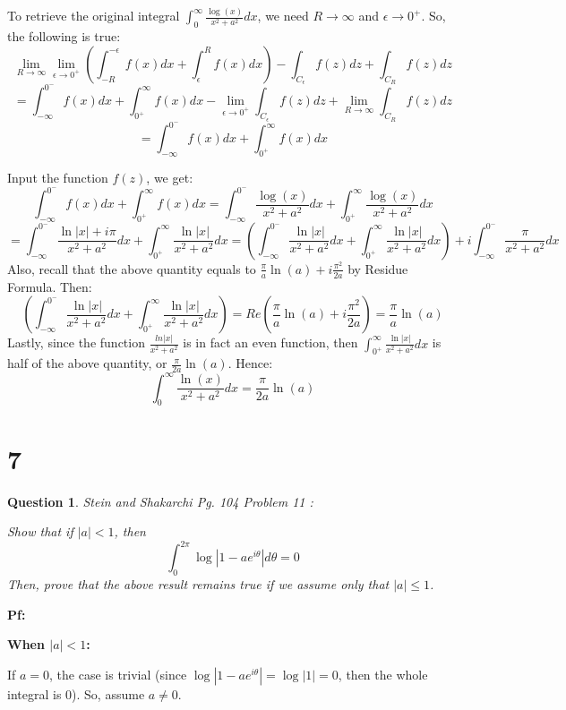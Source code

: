 \documentclass{article}
\newtheorem{question}{Question}
\begin{document}
To retrieve the original integral $\int_{0}^{\infty}\frac{\log(x)}{x^2+a^2}dx$, we need $R\rightarrow\infty$ and $\epsilon\rightarrow 0^+$. So, the following is true:
$$\lim_{R\rightarrow\infty}\lim_{\epsilon\rightarrow 0^+}\left(\int_{-R}^{-\epsilon}f(x)dx+\int_{\epsilon}^{R}f(x)dx\right) - \int_{C_\epsilon}f(z)dz + \int_{C_R}f(z)dz$$
$$ = \int_{-\infty}^{0^-}f(x)dx + \int_{0^+}^{\infty}f(x)dx - \lim_{\epsilon\rightarrow 0^+}\int_{C_\epsilon}f(z)dz + \lim_{R\rightarrow\infty}\int_{C_R}f(z)dz$$
$$ = \int_{-\infty}^{0^-}f(x)dx + \int_{0^+}^{\infty}f(x)dx$$

Input the function $f(z)$, we get:
$$\int_{-\infty}^{0^-}f(x)dx + \int_{0^+}^{\infty}f(x)dx = \int_{-\infty}^{0^-}\frac{\log(x)}{x^2+a^2}dx + \int_{0^+}^{\infty}\frac{\log(x)}{x^2+a^2}dx$$
$$=\int_{-\infty}^{0^-}\frac{\ln|x|+i\pi}{x^2+a^2}dx + \int_{0^+}^{\infty}\frac{\ln|x|}{x^2+a^2}dx = \left(\int_{-\infty}^{0^-}\frac{\ln|x|}{x^2+a^2}dx + \int_{0^+}^{\infty}\frac{\ln|x|}{x^2+a^2}dx\right)+i\int_{-\infty}^{0^-}\frac{\pi}{x^2+a^2}dx$$
Also, recall that the above quantity equals to $\frac{\pi}{a}\ln(a)+i\frac{\pi^2}{2a}$ by Residue Formula. Then:
$$\left(\int_{-\infty}^{0^-}\frac{\ln|x|}{x^2+a^2}dx + \int_{0^+}^{\infty}\frac{\ln|x|}{x^2+a^2}dx\right) = Re\left(\frac{\pi}{a}\ln(a)+i\frac{\pi^2}{2a}\right) = \frac{\pi}{a}\ln(a)$$
Lastly, since the function $\frac{ln|x|}{x^2+a^2}$ is in fact an even function, then $\int_{0^+}^{\infty}\frac{\ln|x|}{x^2+a^2}dx$ is half of the above quantity, or $\frac{\pi}{2a}\ln(a)$.
Hence:
$$\int_{0}^{\infty}\frac{\ln(x)}{x^2+a^2}dx = \frac{\pi}{2a}\ln(a)$$

\break

\section*{7}
\begin{myBox}[]{}
    \begin{question} Stein and Shakarchi Pg. 104 Problem 11
        :

        Show that if $|a|<1$, then
        $$\int_{0}^{2\pi}\log|1-ae^{i\theta}|d\theta =0$$
        Then, prove that the above result remains true if we assume only that $|a|\leq 1$.
    \end{question}
\end{myBox}

\textbf{Pf:}

\textbf{When $|a|<1$:}

If $a=0$, the case is trivial (since $\log|1-ae^{i\theta}| = \log|1|=0$, then the whole integral is $0$). So, assume $a\neq 0$.
\end{document}
